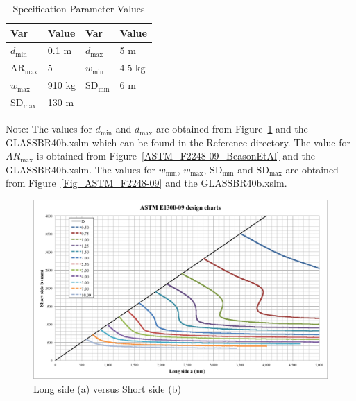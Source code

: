 \documentclass[12pt]{article}
\begin{document}
\begin{table}[!h]
\caption{Specification Parameter Values} \label{TblSpecParams}
\renewcommand{\arraystretch}{1.2}
\begin{center}
\begin{tabular}{l l l l} 
\toprule
\textbf{Var} & \textbf{Value} & \textbf{Var} & \textbf{Value}\\
\midrule 
$d_\text{min}$ & 0.1 \si{\metre} & $d_\text{max}$ & 5 \si{\metre}\\
$\text{AR}_\text{max}$ & 5 & $w_\text{min}$ & 4.5 \si{\kilo\gram}\\  
$w_\text{max}$ & 910 \si{\kilo\gram} & $\text{SD}_\text{min}$ & 6 \si{\metre}\\ 
$\text{SD}_\text{max}$ & 130 \si{\metre}\\  
\bottomrule
\end{tabular}
\end{center}
\end{table}

Note: The values for $d_\text{min}$ and $d_\text{max}$ are obtained from Figure~\ref{Fig_ASTM_E1300-09}
and the GLASS\textunderscore BR\textunderscore 40b.xslm which can be found in the 
Reference directory. The value for $AR_\text{max}$ is obtained from Figure~\ref{ASTM_F2248-09_BeasonEtAl}
and the GLASS\textunderscore BR\textunderscore 40b.xslm.
The values for $w_\text{min}$, $w_\text{max}$, $\text{SD}_\text{min}$ and $\text{SD}_\text{max}$
are obtained from Figure~\ref{Fig_ASTM_F2248-09} and the GLASS\textunderscore BR\textunderscore 40b.xslm. 
\newline

\begin{figure}[h!]
  \begin{center}
    \includegraphics[width=\textwidth]{ASTM_E1300-09_design_charts.png}
    \caption{Long side (a) versus Short side (b)}
    \label{Fig_ASTM_E1300-09}
  \end{center}
\end{figure}
\end{document}

